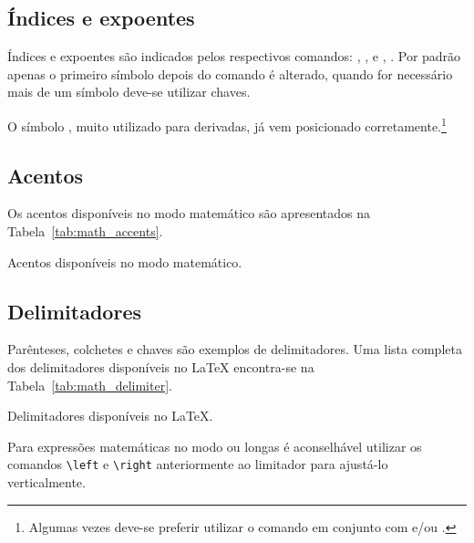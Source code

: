 \subsection{Índices e expoentes}
Índices e
expoentes são indicados pelos
respectivos comandos: , \lcode{_}, e , \lcode{^}.
Por padrão apenas o primeiro símbolo depois do comando é alterado, quando for
necessário mais de um símbolo deve-se utilizar chaves.

O símbolo , muito utilizado para derivadas, já vem posicionado
corretamente.\footnote{Algumas vezes deve-se preferir utilizar o comando
 em conjunto com  e/ou .} \\

\subsection{Acentos}
Os acentos disponíveis no modo
matemático são apresentados na Tabela~\ref{tab:math_accents}.
\begin{table}[h!tb]
  \centering
  \caption{Acentos disponíveis no modo matemático.}
  \label{tab:math_accents}
  
\end{table}

\subsection{Delimitadores}
Parênteses, colchetes e chaves são exemplos de
delimitadores. Uma lista
completa dos delimitadores disponíveis no LaTeX encontra-se na
Tabela~\ref{tab:math_delimiter}.
\begin{table}[h!tb]
  \centering
  \caption{Delimitadores disponíveis no LaTeX.}
  \label{tab:math_delimiter}
  
\end{table}

Para expressões matemáticas no modo  ou longas é aconselhável
utilizar os comandos \lstinline!\left! e \lstinline!\right! anteriormente ao
limitador para ajustá-lo verticalmente. \\

